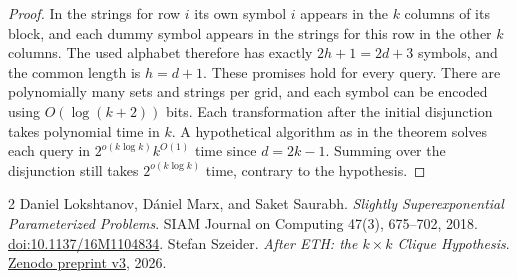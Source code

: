 \documentclass[11pt]{article}
\begin{document}
\begin{proof}
In the strings for row $i$ its own symbol $i$ appears in the $k$ columns of its block, and each dummy symbol appears in the strings for this row in the other $k$ columns. The used alphabet therefore has exactly $2h+1=2d+3$ symbols, and the common length is $h=d+1$. These promises hold for every query. There are polynomially many sets and strings per grid, and each symbol can be encoded using $O(\log(k+2))$ bits. Each transformation after the initial disjunction takes polynomial time in $k$. A hypothetical algorithm as in the theorem solves each query in $2^{o(k\log k)}k^{O(1)}$ time since $d=2k-1$. Summing over the disjunction still takes $2^{o(k\log k)}$ time, contrary to the hypothesis.
\end{proof}

\begin{thebibliography}{2}
Daniel Lokshtanov, D\'aniel Marx, and Saket Saurabh.
\emph{Slightly Superexponential Parameterized Problems}.
SIAM Journal on Computing 47(3), 675--702, 2018.
\href{https://doi.org/10.1137/16M1104834}{doi:10.1137/16M1104834}.
Stefan Szeider.
\emph{After ETH: the $k\times k$ Clique Hypothesis}.
\href{https://doi.org/10.5281/zenodo.24088151}{Zenodo preprint v3}, 2026.
\end{thebibliography}
\end{document}
